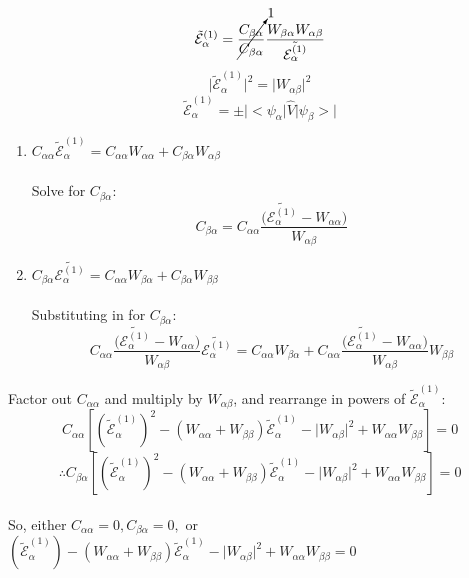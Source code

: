 \documentclass[12pt,fancychapters]{report}
\numberwithin{equation}{section}
\begin{document}
\[
  \tilde{\mathcal{E}}_\alpha^{(1)} = \cancelto{1}{\frac{C_{\beta\alpha}}{C_{\beta\alpha}}} 
  \frac{W_{\beta\alpha}W_{\alpha\beta}}{\tilde{\mathcal{E}_\alpha^{(1)}}}
\]
\[
  \big|\tilde{\mathcal{E}}_\alpha^{(1)}\big|^2 = \big|W_{\alpha\beta}\big|^2
\]
\begin{equation*}
  \boxed{\tilde{\mathcal{E}}_\alpha^{(1)} = \pm \big|\big<\psi_\alpha\big|\hat{V}\big|\psi_\beta
  \big>\big|}
\end{equation*}
\begin{enumerate}
  \item $C_{\alpha\alpha}\tilde{\mathcal{E}}_\alpha^{(1)} = C_{\alpha\alpha}W_{\alpha\alpha}+
    C_{\beta\alpha}W_{\alpha\beta}$\\
    \\
    Solve for $C_{\beta\alpha}:$
    \[
      C_{\beta\alpha} = C_{\alpha\alpha}\frac{\big(\tilde{\mathcal{E}_\alpha^{(1)}}-
      W_{\alpha\alpha}\big)}{W_{\alpha\beta}}
    \]
  \item $C_{\beta\alpha}\tilde{\mathcal{E}_\alpha^{(1)}} =C_{\alpha\alpha}W_{\beta\alpha}+ 
    C_{\beta\alpha}W_{\beta\beta}$\\
    \\
    Substituting in for $C_{\beta\alpha}:$
    \[
      C_{\alpha\alpha} \frac{\big(\tilde{\mathcal{E}_\alpha^{(1)}}- W_{\alpha\alpha}\big)}
      {W_{\alpha\beta}}\tilde{\mathcal{E}_\alpha^{(1)}} = C_{\alpha\alpha}W_{\beta\alpha}
      + C_{\alpha\alpha}\frac{\big(\tilde{\mathcal{E}_\alpha^{(1)}}- W_{\alpha\alpha}\big)}
      {W_{\alpha\beta}}W_{\beta\beta}
    \]
\end{enumerate}
Factor out $C_{\alpha\alpha}$ and multiply by $W_{\alpha\beta}$, and rearrange in powers of 
$\tilde{\mathcal{E}}_\alpha^{(1)}$:
\[
  C_{\alpha\alpha}\left[\left(\tilde{\mathcal{E}}_\alpha^{(1)}\right)^2-\left( 
  W_{\alpha\alpha}+W_{\beta\beta}\right)\tilde{\mathcal{E}}_\alpha^{(1)}  - \big|W_{\alpha
\beta}\big|^2+W_{\alpha\alpha}W_{\beta\beta}\right] = 0
\]
\[
  \therefore C_{\beta\alpha}\left[\left(\tilde{\mathcal{E}}_\alpha^{(1)}\right)^2 - 
  \left(W_{\alpha\alpha}+W_{\beta\beta}\right)\tilde{\mathcal{E}}_\alpha^{(1)} - 
\big|W_{\alpha\beta}\big|^2 + W_{\alpha\alpha}W_{\beta\beta}\right]=0
\]\\
So, either $C_{\alpha\alpha} = 0, C_{\beta\alpha} = 0,$ or $\left(\tilde{\mathcal{E}}_\alpha^{(1)}
\right) - \left(W_{\alpha\alpha}+W_{\beta\beta}\right)\tilde{\mathcal{E}}_\alpha^{(1)}
- \big|W_{\alpha\beta}\big|^2 + W_{\alpha\alpha}W_{\beta\beta} = 0$\\
\\
\end{document}
